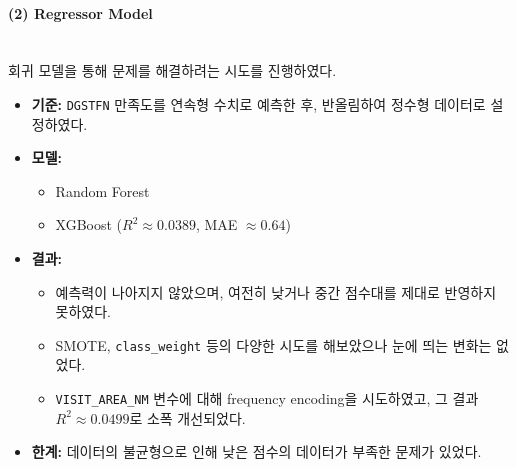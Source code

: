\documentclass[sigconf]{acmart}
\begin{document}
\begin{CJK}{UTF8}{mj}
\paragraph{(2) Regressor Model}\mbox{}\\
회귀 모델을 통해 문제를 해결하려는 시도를 진행하였다.
\begin{itemize}
  \item \textbf{기준:} \texttt{DGSTFN} 만족도를 연속형 수치로 예측한 후, 반올림하여 정수형 데이터로 설정하였다.
  \item \textbf{모델:}
  \begin{itemize}
    \item Random Forest
    \item XGBoost ($R^2 \approx 0.0389$, MAE $\approx 0.64$)
  \end{itemize}
  \item \textbf{결과:}
  \begin{itemize}
    \item 예측력이 나아지지 않았으며, 여전히 낮거나 중간 점수대를 제대로 반영하지 못하였다.
    \item SMOTE, \texttt{class\_weight} 등의 다양한 시도를 해보았으나 눈에 띄는 변화는 없었다.
    \item \texttt{VISIT\_AREA\_NM} 변수에 대해 frequency encoding을 시도하였고, 그 결과 $R^2 \approx 0.0499$로 소폭 개선되었다.
  \end{itemize}
  \item \textbf{한계:} 데이터의 불균형으로 인해 낮은 점수의 데이터가 부족한 문제가 있었다.
\end{itemize}


\end{CJK}
\end{document}
